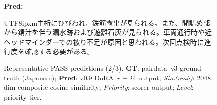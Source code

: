 \documentclass[onecolumn]{article}
\begin{document}
\begin{figure}[H]
\begin{minipage}[t]{0.46\textwidth}
{    \textbf{Pred:} \begin{CJK}{UTF8}{ipxm}主桁にひびわれ、{鉄筋露出}が見られる。また、間詰め部から錆汁を伴う漏水跡および{遊離石灰}が見られる。車両通行時や近ヘッドマインダーでの被り不足が原因と思われる。次回点検時に進行度を確認する必要がある。\end{CJK}
    \par}
  \end{minipage}
  \caption{Representative PASS predictions (2/3). \textbf{GT}: pairdata~v3 ground truth (Japanese); \textbf{Pred}: v0.9 DoRA~$r{=}24$ output; \textit{Sim(emb)}: 2048-dim composite cosine similarity; \textit{Priority}: scorer output; \textit{Level}: priority tier.}
  \label{fig:u73_pass_2}
\end{figure}
\clearpage
\end{document}
